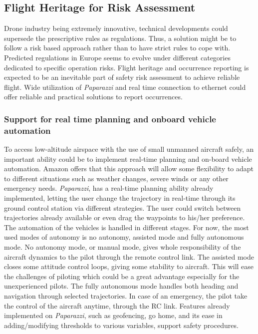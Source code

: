 \subsection{Flight Heritage for Risk Assessment}

Drone industry being extremely innovative, technical developments could supersede the prescriptive rules as regulations. Thus, a solution might be to follow a risk based approach rather than to have strict rules to cope with. Predicted regulations in Europe seems to evolve under different categories dedicated to specific operation risks. Flight heritage and occurrence reporting is expected to be an inevitable part of safety risk assessment to achieve reliable flight. Wide utilization of \emph{Paparazzi} and real time connection to ethernet could offer reliable and practical solutions to report occurrences.  

\subsubsection{Support for real time planning and onboard vehicle automation}
To access low-altitude airspace with the use of small unmanned aircraft safely, an important ability could be to implement real-time planning and on-board vehicle automation. Amazon offers that this approach will allow some flexibility to adapt to different situations such as weather changes, severe winds or any other emergency needs. \emph{Paparazzi}, has a real-time planning ability already implemented, letting the user change the trajectory in real-time through its ground control station via different strategies. The user could switch between trajectories already available or even drag the waypoints to his/her preference. The automation of the vehicles is handled in different stages. For now, the most used modes of autonomy is no autonomy, assisted mode and fully autonomous mode. No autonomy mode, or manual mode, gives whole responsibility of the aircraft dynamics to the pilot through the remote control link.  The assisted mode closes some attitude control loops, giving some stability to aircraft. This will ease the challenges of piloting which could be a great advantage especially for the unexperienced pilots. The fully autonomous mode handles both heading and navigation through selected trajectories. In case of an emergency, the pilot take the control of the aircraft anytime, through the RC link. Features already implemented on \emph{Paparazzi}, such as geofencing, go home, and its ease in adding/modifying thresholds to various variables, support safety procedures.

